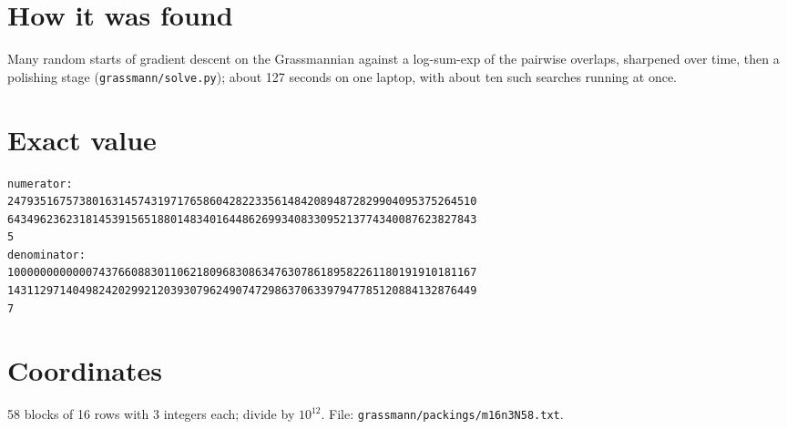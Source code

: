 \documentclass[11pt,a4paper]{article}
\begin{document}
\section{How it was found}
Many random starts of gradient descent on the Grassmannian against a log-sum-exp of the pairwise overlaps, sharpened over time, then a polishing stage (\texttt{grassmann/solve.py}); about 127 seconds on one laptop, with about ten such searches running at once.


\appendix
\section{Exact value}
{\small
\begin{verbatim}
numerator:
247935167573801631457431971765860428223356148420894872829904095375264510
643496236231814539156518801483401644862699340833095213774340087623827843
5
denominator:
100000000000074376608830110621809683086347630786189582261180191910181167
143112971404982420299212039307962490747298637063397947785120884132876449
7
\end{verbatim}}

\section{Coordinates}
58 blocks of 16 rows with 3 integers each; divide by $10^{12}$. File: \texttt{grassmann/packings/m16n3N58.txt}.
{\tiny
\begin{multicols}{3}
\end{multicols}}
\end{document}
